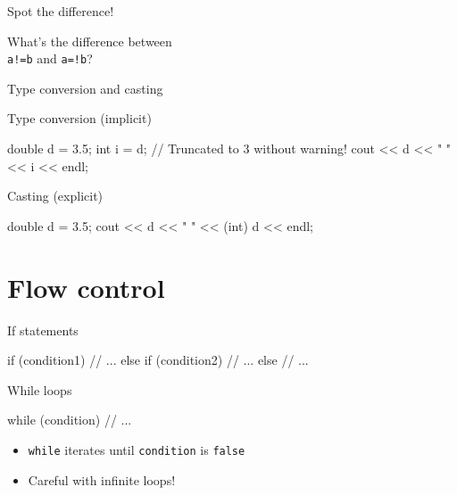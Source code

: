 \begin{frame}[fragile]{Spot the difference!}
    \begin{center}
        {\Large%
         What's the difference between \\[1em]
         \texttt{a!=b} and \texttt{a=!b}?}
    \end{center}
\end{frame}

\begin{frame}[fragile]{Type conversion and casting}
    \begin{block}{Type conversion (implicit)}
        \begin{cpp}
            double d = 3.5;
            int i = d; // Truncated to 3 without warning!
            cout << d << " " << i << endl;
        \end{cpp}
    \end{block}
    \begin{block}{Casting (explicit)}
        \begin{cpp}
            double d = 3.5;
            cout << d << " " << (int) d << endl;
        \end{cpp}
    \end{block}
\end{frame}

\section{Flow control}

\begin{frame}[fragile]{If statements}
    \begin{cpp}
        if (condition1)
        {
            // ...
        }
        else if (condition2)
        {
            // ...
        }
        else
        {
            // ...
        }
    \end{cpp}
\end{frame}


\begin{frame}[fragile]{While loops}
    \begin{cpp}
        while (condition)
        {
            // ...
        }
    \end{cpp}
    \vspace{-1em}
    \begin{itemize}
        \item \texttt{while} iterates until \texttt{condition}
              is \texttt{false}
        \item Careful with infinite loops!
    \end{itemize}
\end{frame}

